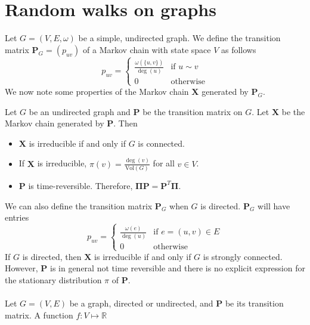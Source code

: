\section{Random walks on graphs}
\label{sec:random-walks-graphs}
Let $G = (V,E,\omega)$ be a simple, undirected graph. We define the transition
matrix $\mathbf{P}_G = (p_{uv})$ of a Markov chain with state space $V$ as follows
\begin{equation}
  \label{eq:20}
  p_{uv} = \begin{cases}
    \tfrac{\omega(\{u,v\})}{\deg(u)} & \text{if $u \sim v$} \\
    0 & \text{otherwise}
  \end{cases}
\end{equation}
We now note some properties of the Markov chain $\mathbf{X}$ generated
by $\mathbf{P}_G$.
\begin{proposition}
  \label{prop:15}
  Let $G$ be an undirected graph and $\mathbf{P}$ be the transition
  matrix on $G$. Let $\mathbf{X}$ be the Markov chain generated by
  $\mathbf{P}$. Then 
\begin{itemize}
\item $\mathbf{X}$ is irreducible if and only if $G$ is connected.
\item If $\mathbf{X}$ is irreducible, $\pi(v) =
  \tfrac{\deg(v)}{\mathrm{Vol}(G)}$ for all $v \in V$.
\item $\mathbf{P}$ is time-reversible. Therefore, $\bm{\Pi}\mathbf{P} = \mathbf{P}^{T}\bm{\Pi}$.
\end{itemize}
\end{proposition}
%
We can also define the transition matrix $\mathbf{P}_G$ when $G$ is
directed. $\mathbf{P}_G$ will have entries
\begin{equation}
  \label{eq:18}
  p_{uv} = \begin{cases}
    \tfrac{\omega(e)}{\deg(u)} & \text{if $e = (u,v) \in E$} \\
    0 & \text{otherwise}
  \end{cases}
\end{equation}
If $G$ is directed, then $\mathbf{X}$ is irreducible if and only if
$G$ is strongly connected. However, $\mathbf{P}$ is in general not
time reversible and there is no explicit expression for the
stationary distribution $\pi$ of $\mathbf{P}$. \\ \\
%
%
\noindent Let $G = (V,E)$ be a graph, directed or undirected, and $\mathbf{P}$
be its transition matrix. A function $f \colon V \mapsto \mathbb{R}$

